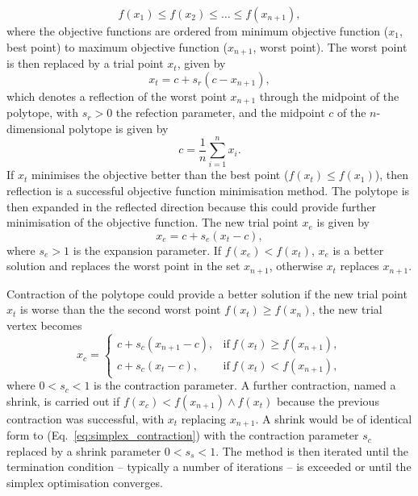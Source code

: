 \documentclass[../main.tex]{subfiles}
\begin{document}
\begin{equation}
f\left(x_{1}\right) \leq f\left(x_{2}\right) \leq \ldots \leq f\left(x_{n+1}\right),
\label{eq:simplex_polytope_objective_functions}
\end{equation}
where the objective functions are ordered from minimum objective function ($x_{1}$, best point) to maximum objective function ($x_{n+1}$, worst point). The worst point is then replaced by a trial point $x_{t}$, given by
\begin{equation}
x_{t} = c+s_{r}\left(c-x_{n+1}\right),
\label{eq:simplex_trial_point}    
\end{equation}
which denotes a reflection of the worst point $x_{n+1}$ through the midpoint of the polytope, with $s_{r} > 0$ the refection parameter, and the midpoint $c$ of the $n$-dimensional polytope is given by
\begin{equation}
c = \frac{1}{n}\sum_{i=1}^{n}x_{i}.
\label{eq:polytope_centroid_simplex}
\end{equation}
If $x_{t}$ minimises the objective better than the best point ($f\left(x_{t}\right) \leq f\left(x_{1}\right)$), then reflection is a successful objective function minimisation method. The polytope is then expanded in the reflected direction because this could provide further minimisation of the objective function. The new trial point $x_{e}$ is given by
\begin{equation}
x_{e} = c+s_{e}\left(x_{t}-c\right),
\label{eq:simplex_expansion}    
\end{equation}
where $s_{e} > 1$ is the expansion parameter. If $f\left(x_{e}\right) < f\left(x_{t}\right)$, $x_{e}$ is a better solution and replaces the worst point in the set $x_{n+1}$, otherwise $x_{t}$ replaces $x_{n+1}$. 

Contraction of the polytope could provide a better solution if the new trial point $x_{t}$ is worse than the the second worst point $f\left(x_{t}\right) \geq f\left(x_{n}\right)$, the new trial vertex becomes
\begin{equation}
x_{c} = 
\begin{cases}
c+s_{c}\left(x_{n+1}-c\right), & \text{if}  ~f\left(x_{t}\right) \geq f\left(x_{n+1}\right), \\
c+s_{c}\left(x_{t}-c\right), & \text{if}  ~f\left(x_{t}\right) < f\left(x_{n+1}\right),
\end{cases}
\label{eq:simplex_contraction}
\end{equation}
where $0 < s_{c} < 1$ is the contraction parameter. A further contraction, named a shrink, is carried out if $f\left(x_{c}\right) < f\left(x_{n+1}\right) \land f\left(x_{t}\right)$ because the previous contraction was successful, with $x_{t}$ replacing $x_{n+1}$. A shrink would be of identical form to (Eq.~\ref{eq:simplex_contraction}) with the contraction parameter $s_{c}$ replaced by a shrink parameter $0 < s_{s} < 1$. The method is then iterated until the termination condition -- typically a number of iterations -- is exceeded or until the simplex optimisation converges. 
\end{document}
